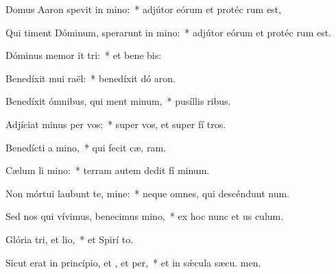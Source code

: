 \item Domus Aaron spevit in mino:~* adjútor eórum et protéc rum est,
\item Qui timent Dóminum, sperarunt in mino:~* adjútor eórum et protéc rum est.
\item Dóminus memor it tri:~* et bene bis:
\item Benedíxit mui raël:~* benedíxit dó aron.
\item Benedíxit ómnibus, qui ment minum,~* pusíllis  ribus.
\item Adjíciat minus per vos:~* super vos, et super fí tros.
\item Benedícti  a mino,~* qui fecit cæ,  ram.
\item Cælum li mino:~* terram autem dedit fí minum.
\item Non mórtui laubunt te, mine:~* neque omnes, qui descéndunt  num.
\item Sed nos qui vívimus, benecimus mino,~* ex hoc nunc et us  culum.
\item Glória tri, et lio,~* et Spirí to.
\item Sicut erat in princípio, et , et per,~* et in sǽcula sæcu. men.
